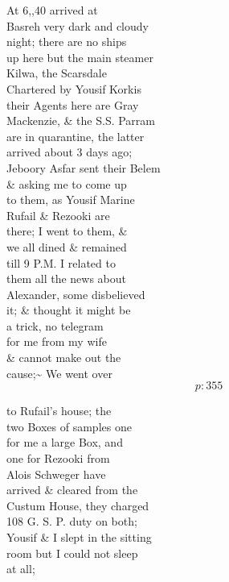 \documentclass{report}
\begin{document}
	\par{
 	At 6,,40 arrived at\ \\Basreh very dark and cloudy\ \\night; there are no ships\ \\up here but the main steamer\ \\Kilwa, the Scarsdale\ \\Chartered by Yousif Korkis\ \\their Agents here are Gray\ \\Mackenzie, \& the S.S. Parram\ \\are in quarantine, the latter\ \\arrived about 3 days ago;\ \\Jeboory Asfar sent their Belem\ \\\& asking me to come up\ \\to them, as Yousif Marine\ \\Rufail \& Rezooki are\ \\there; I went to them, \&\ \\we all dined \& remained\ \\till 9 P.M. I related to\ \\them all the news about\ \\Alexander, some disbelieved\ \\it; \& thought it might be\ \\a trick, no telegram\ \\for me from my wife\ \\\& cannot make out the\ \\cause;\~{} We went over\ \\
  \[p: 355 \]

	}



	\par{
 	to Rufail’s house; the\ \\two Boxes of samples one\ \\for me a large Box, and\ \\one for Rezooki from\ \\Alois Schweger have\ \\arrived \& cleared from the\ \\Custum House, they charged\ \\108 G. S. P. duty on both;\ \\Yousif \& I slept in the sitting\ \\room but I could not sleep\ \\at all;\ \\
	}
\end{document}
